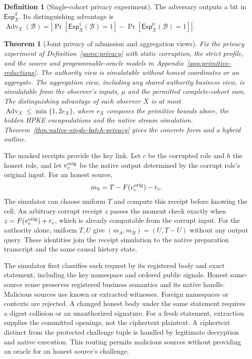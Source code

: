 \documentclass[conference,compsoc]{IEEEtran}
\theoremstyle{definition}
\newtheorem{definition}{Definition}[section]
\newtheorem{definition}{Definition}
\numberwithin{equation}{section}
\numberwithin{table}{section}
\numberwithin{figure}{section}
\theoremstyle{plain}
\newtheorem{theorem}{Theorem}[section]
\newtheorem{theorem}{Theorem}
\begin{document}
\begin{definition}[Single-cohort privacy experiment]
The adversary outputs a bit in \(\mathsf{Exp}_X^d\). Its distinguishing
advantage is \(\operatorname{Adv}_X(\mathcal B)=
|\Pr[\mathsf{Exp}_X^1(\mathcal B)=1]-
\Pr[\mathsf{Exp}_X^0(\mathcal B)=1]|\).
\end{definition}

\begin{theorem}[Joint privacy of admission and aggregation views]
\label{thm:joint-privacy-main}
Fix the privacy experiment of Definition~\ref{game:privacy} with static corruption,
the strict profile, and the source and programmable-oracle models in
Appendix~\ref{app:primitive-reductions}. The authority view is simulatable without honest coordinates or an aggregate.
The aggregation view, including any shared authority business view, is simulatable
from the observer's inputs, \(\mu\) and the permitted complete-cohort sum. The distinguishing advantage of each observer \(X\) is at most
\(\operatorname{Adv}_X\le\min\{1,2e_X\}\), where \(e_X\) composes the
primitive bounds above, the hidden HPKE encapsulations and the native
stream simulation. Theorem~\ref{thm:native-single-batch-privacy} gives the
concrete form and a hybrid outline.
\end{theorem}

The masked receipts provide the key link. Let \(c\) be the corrupted role
and \(h\) the honest role, and let \(v_c^{\rm orig}\) be the native output
determined by the corrupt role's original input. For an honest source,
\begin{equation}
 m_h=T-F(v_c^{\rm orig})-r_c.
 \label{eq:receipt-simulation}
\end{equation}
The simulator can choose uniform \(T\) and compute this receipt before
knowing the cell. An arbitrary corrupt receipt \(z\) passes the moment
check exactly when \(z=F(v_c^{\rm orig})+r_c\), which is already computable
from the corrupt input. For the authority alone, uniform \(T,U\) give
\((m_A,m_R)=(U,T-U)\) without any output query. These identities join
the receipt simulation to the native preparation transcript and the same
causal history state.

The simulator first classifies each request by its registered body and exact
statement, including the key namespace and ordered public signals. Honest
same-source reuse preserves registered business semantics and its native handle.
Malicious sources use known or extracted witnesses. Foreign namespaces or
contexts are rejected. A changed honest body under the same statement
requires a digest collision or an unauthorized signature. For a fresh
statement, extraction supplies the committed openings, not the ciphertext
plaintext. A ciphertext distinct from the protected challenge tuple is handled
by legitimate decryption and native execution. This routing permits malicious
sources without providing an oracle for an honest source's challenge.
\end{document}
